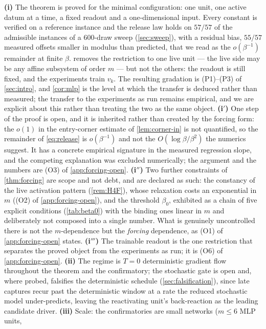\documentclass[11pt]{article}
\theoremstyle{definition}
\theoremstyle{remark}
\begin{document}
\textbf{(i)} The theorem is proved for the minimal configuration: one unit, one
active datum at a time, a fixed readout and a one-dimensional input. Every
constant is verified on a reference instance and the release law holds on
$57/57$ of the admissible instances of a 600-draw sweep (\cref{sec:sweep}), with
a residual bias, $55/57$ measured offsets smaller in modulus than predicted,
that we read as the $o(\beta^{-1})$ remainder at finite $\beta$. 
removes the restriction to one live unit --- the live side may be any affine
subsystem of order $m$ --- but not the others: the readout is still fixed, and
the experiments train $v_k$. The resulting gradation is (P1)--(P3) of
\cref{sec:intro}, and \cref{cor:mlp} is the level at which the transfer is
deduced rather than measured; the transfer to the experiments as run remains
empirical, and we are explicit about this rather than treating the two as the
same object.
\textbf{(i$'$)} One step of the proof is open, and it is inherited rather than
created by the forcing form: the $o(1)$ in the entry-corner estimate of
\cref{lem:corner-in} is not quantified, so the remainder of \eqref{eq:release}
is $o(\beta^{-1})$ and not the $O(\log\beta/\beta^2)$ the numerics suggest. It
has a concrete empirical signature in the measured regression slope, and the
competing explanation was excluded numerically; the argument and the numbers are
(O3) of \cref{app:forcing-open}.
\textbf{(i$''$)} Two further constraints of \cref{thm:forcing} are scope and not
debt, and are declared as such: the constancy of the live activation pattern
(\cref{rem:H4F}), whose relaxation costs an exponential in $m$ ((O2) of
\cref{app:forcing-open}), and the threshold $\beta_0$, exhibited as a chain of
five explicit conditions (\cref{tab:beta0}) with the binding ones linear in $m$
and deliberately not composed into a single number. What is genuinely
uncontrolled there is not the $m$-dependence but the \emph{forcing} dependence,
as (O1) of \cref{app:forcing-open} states.
\textbf{(i$'''$)} The trainable readout is the one restriction that separates
the proved object from the experiments as run; it is (O6) of
\cref{app:forcing-open}.
\textbf{(ii)} The regime is $T=0$ deterministic gradient flow throughout the
theorem and the confirmatory; the stochastic gate is open and, where probed,
falsifies the deterministic schedule (\cref{sec:falsification}), since late
captures recur past the deterministic window at a rate the reduced stochastic
model under-predicts, leaving the reactivating unit's back-reaction as the
leading candidate driver.
\textbf{(iii)} Scale: the confirmatories are small networks ($m\le6$ MLP units,
\end{document}
